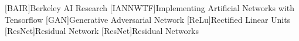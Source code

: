 \documentclass[fleqn,10pt]{SelfArx} %
\begin{document}




\begin{acronym}
[BAIR]{Berkeley AI Research}
[IANNWTF]{Implementing Artificial Networks with Tensorflow}
[GAN]{Generative Adversarial Network}
[ReLu]{Rectified Linear Units}
[ResNet]{Residual Network}
[ResNet]{Residual Networks}
\end{acronym}

\end{document}
